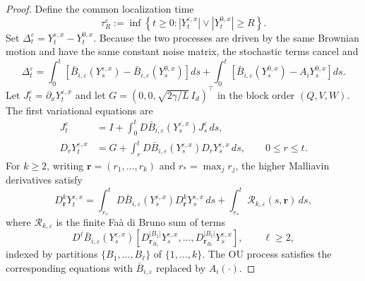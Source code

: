 \documentclass[11pt]{article}
\numberwithin{equation}{section}
\theoremstyle{plain}
\theoremstyle{definition}
\theoremstyle{remark}
\newcommand{\eps}{\varepsilon}
\begin{document}
\begin{proof}
Define the common localization time
\[
\tau_R^\eps
:=\inf\left\{t\ge0:
\left|Y_t^{\eps,x}\right|\vee\left|Y_t^{0,x}\right|\ge R\right\}.
\]
Set $\Delta_t^\eps=Y_t^{\eps,x}-Y_t^{0,x}$.  Because the two processes are
driven by the same Brownian motion and have the same constant noise matrix,
the stochastic terms cancel and
\begin{equation}
\label{eq:well-process-difference-equation}
\Delta_t^\eps
=\int_0^t\left[\bar B_{i,\eps}\left(Y_s^{\eps,x}\right)
                 -\bar B_{i,\eps}\left(Y_s^{0,x}\right)\right]ds
 +\int_0^t\left[\bar B_{i,\eps}\left(Y_s^{0,x}\right)-A_iY_s^{0,x}\right]ds.
\end{equation}
Let $J_t^\eps=\partial_xY_t^{\eps,x}$ and let
$G=\left(0,0,\sqrt{2\gamma/L}\,I_d\right)^\top$ in the block order $(Q,V,W)$.
The first variational equations are
\begin{equation}
\label{eq:well-first-variational-equations}
\begin{aligned}
J_t^\eps
&=I+\int_0^tD\bar B_{i,\eps}(Y_s^{\eps,x})J_s^\eps\,ds,\\
D_rY_t^{\eps,x}
&=G+\int_r^tD\bar B_{i,\eps}(Y_s^{\eps,x})D_rY_s^{\eps,x}\,ds,
\qquad 0\le r\le t.
\end{aligned}
\end{equation}
For $k\ge2$, writing $\mathbf r=(r_1,\ldots,r_k)$ and
$r_*=\max_j r_j$, the higher Malliavin derivatives satisfy
\begin{equation}
\label{eq:well-higher-variational-equation}
D_{\mathbf r}^kY_t^{\eps,x}
=\int_{r_*}^tD\bar B_{i,\eps}(Y_s^{\eps,x})
                 D_{\mathbf r}^kY_s^{\eps,x}\,ds
 +\int_{r_*}^t\mathcal R_{k,\eps}(s,\mathbf r)\,ds,
\end{equation}
where $\mathcal R_{k,\eps}$ is the finite Fa\`a di Bruno sum of terms
\[
D^\ell\bar B_{i,\eps}(Y_s^{\eps,x})
\left[D_{\mathbf r_{B_1}}^{|B_1|}Y_s^{\eps,x},\ldots,
      D_{\mathbf r_{B_\ell}}^{|B_\ell|}Y_s^{\eps,x}\right],
\qquad \ell\ge2,
\]
indexed by partitions $\{B_1,\ldots,B_\ell\}$ of
$\{1,\ldots,k\}$.  The OU process satisfies the corresponding equations
with $\bar B_{i,\eps}$ replaced by $A_i(\cdot)$.


\end{proof}
\end{document}
